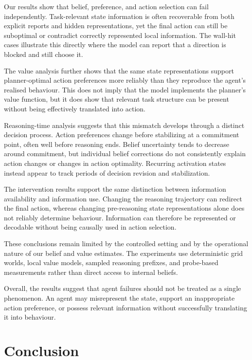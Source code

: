 \documentclass{article}
\begin{document}
Our results show that belief, preference, and action selection can fail independently. Task-relevant state information is often recoverable from both explicit reports and hidden representations, yet the final action can still be suboptimal or contradict correctly represented local information. The wall-hit cases illustrate this directly where the model can report that a direction is blocked and still choose it.

The value analysis further shows that the same state representations support planner-optimal action preferences more reliably than they reproduce the agent's realised behaviour. This does not imply that the model implements the planner's value function, but it does show that relevant task structure can be present without being effectively translated into action.

Reasoning-time analysis suggests that this mismatch develops through a distinct decision process. Action preferences change before stabilizing at a commitment point, often well before reasoning ends. Belief uncertainty tends to decrease around commitment, but individual belief corrections do not consistently explain action changes or changes in action optimality. Recurring activation states instead appear to track periods of decision revision and stabilization.

The intervention results support the same distinction between information availability and information use. Changing the reasoning trajectory can redirect the final action, whereas changing pre-reasoning state representations alone does not reliably determine behaviour. Information can therefore be represented or decodable without being causally used in action selection.

These conclusions remain limited by the controlled setting and by the operational nature of our belief and value estimates. The experiments use deterministic grid worlds, local value models, sampled reasoning prefixes, and probe-based measurements rather than direct access to internal beliefs.

Overall, the results suggest that agent failures should not be treated as a single phenomenon. An agent may misrepresent the state, support an inappropriate action preference, or possess relevant information without successfully translating it into behaviour.

\section{Conclusion}
\label{sec:conclusion}
\end{document}
